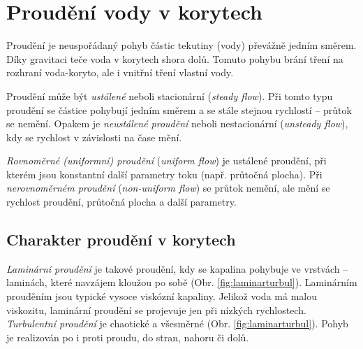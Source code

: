 \section{Proudění vody v korytech}
Proudění je neuspořádaný pohyb částic tekutiny (vody) převážně jedním směrem. Díky gravitaci teče voda v korytech shora dolů. Tomuto pohybu brání tření na rozhraní voda-koryto, ale i vnitřní tření vlastní vody. 

Proudění může být \emph{ustálené} neboli stacionární (\textit{steady flow}). Při tomto typu proudění se částice pohybují jedním směrem a se stále stejnou rychlostí -- průtok se nemění.  Opakem je \emph{neustálené proudění} neboli nestacionární (\textit{unsteady flow}), kdy se rychlost v závislosti na čase mění.

\emph{Rovnoměrné (uniformní) proudění} (\textit{uniform flow}) je ustálené proudění, při kterém jsou konstantní další parametry toku (např. průtočná plocha). Při \emph{nerovnoměrném proudění} (\textit{non-uniform flow}) se průtok nemění, ale mění se rychlost proudění, průtočná plocha a další parametry. 

\subsection{Charakter proudění v korytech}
\emph{Laminární proudění} je takové proudění, kdy se kapalina pohybuje ve vrstvách -- laminách, které navzájem kloužou po sobě (Obr. \ref{fig:laminarturbul}). Laminárním prouděním jsou typické vysoce viskózní kapaliny. Jelikož voda má malou viskozitu, laminární proudění se projevuje jen při nízkých rychlostech.
\emph{Turbulentní proudění} je chaotické a všesměrné (Obr. \ref{fig:laminarturbul}). Pohyb je realizován po i proti proudu, do stran, nahoru či dolů. 

